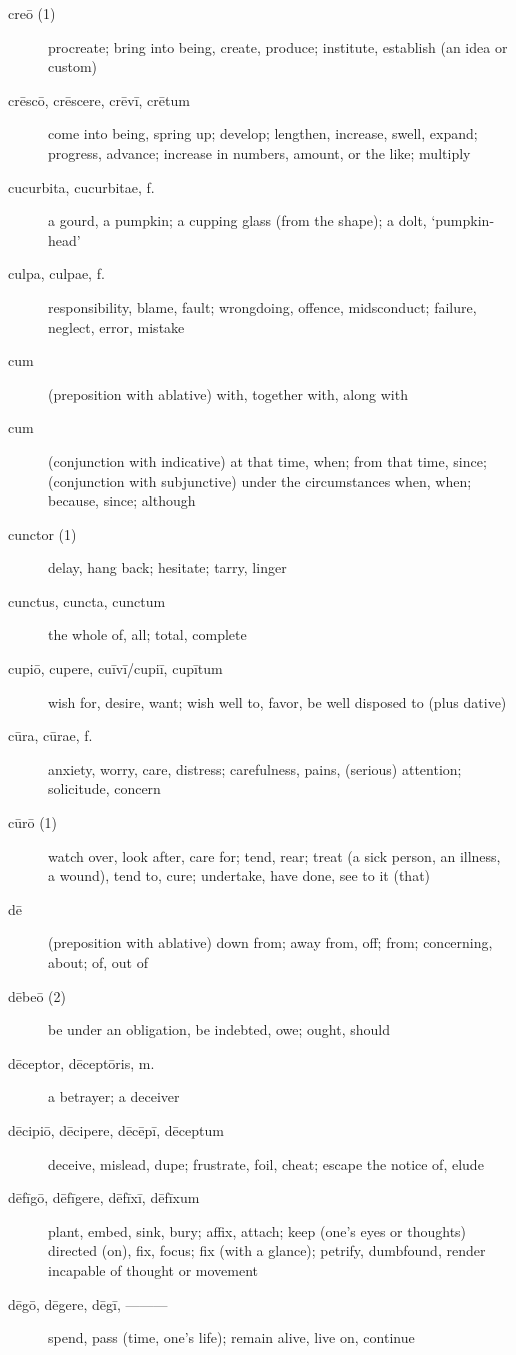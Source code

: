 \begin{description}
    \item[creō (1)] procreate; bring into being, create, produce; institute, establish (an idea or custom)
    \item[crēscō, crēscere, crēvī, crētum] come into being, spring up; develop; lengthen, increase, swell, expand; progress, advance; increase in numbers, amount, or the like; multiply
    \item[cucurbita, cucurbitae, f.] a gourd, a pumpkin; a cupping glass (from the shape); a dolt, `pumpkin-head'
    \item[culpa, culpae, f.] responsibility, blame, fault; wrongdoing, offence, midsconduct; failure, neglect, error, mistake
    \item[cum] (preposition with ablative) with, together with, along with
    \item[cum] (conjunction with indicative) at that time, when; from that time, since; (conjunction with subjunctive) under the circumstances when, when; because, since; although
    \item[cunctor (1)] delay, hang back; hesitate; tarry, linger
    \item[cunctus, cuncta, cunctum] the whole of, all; total, complete
    \item[cupiō, cupere, cuīvī/cupiī, cupītum] wish for, desire, want; wish well to, favor, be well disposed to (plus dative)
    \item[cūra, cūrae, f.] anxiety, worry, care, distress; carefulness, pains, (serious) attention; solicitude, concern
    \item[cūrō (1)] watch over, look after, care for; tend, rear; treat (a sick person, an illness, a wound), tend to, cure; undertake, have done, see to it (that)
    \item[dē] (preposition with ablative) down from; away from, off; from; concerning, about; of, out of
    \item[dēbeō (2)] be under an obligation, be indebted, owe; ought, should
    \item[dēceptor, dēceptōris, m.] a betrayer; a deceiver
    \item[dēcipiō, dēcipere, dēcēpī, dēceptum] deceive, mislead, dupe; frustrate, foil, cheat; escape the notice of, elude
    \item[dēfīgō, dēfīgere, dēfīxī, dēfīxum] plant, embed, sink, bury; affix, attach; keep (one's eyes or thoughts) directed (on), fix, focus; fix (with a glance); petrify, dumbfound, render incapable of thought or movement
    \item[dēgō, dēgere, dēgī, ———] spend, pass (time, one's life); remain alive, live on, continue

\end{description}
